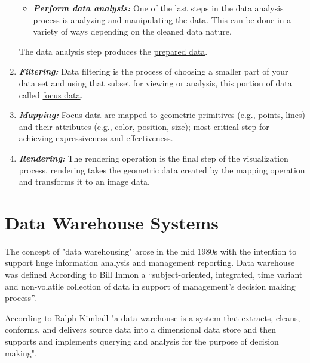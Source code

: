 \begin{enumerate}
\begin{itemize}
  \item \textbf{\textit{Perform data analysis:}}  One of the last steps in the data analysis process is analyzing and manipulating the data. This can be done in a variety of ways depending on the cleaned data nature\cite{WhatDataAnalysis}.
  \end{itemize}
  The data analysis step produces the \underline{prepared data}.
  \item \textbf{\textit{Filtering:}} Data filtering is the process of choosing a smaller part of your data set and using that subset for viewing or analysis\cite{WhatDataFiltering}, this portion of data called \underline{focus data}. 
  \item \textbf{\textit{Mapping:}} Focus data are mapped to geometric primitives (e.g., points, lines) and their attributes (e.g., color, position, size); most critical step for achieving expressiveness and effectiveness.
  \item \textbf{\textit{Rendering:}} The rendering operation is the final step of the visualization process, rendering takes the geometric data created by the mapping operation and transforms it to an image data.
  \end{enumerate}
  



\section{Data Warehouse Systems}
\label{sec:dataWarehouse}
The concept of "data warehousing" arose in the mid 1980s with the intention to support huge information analysis and management reporting\cite{wahDevelopmentDataWarehouse2009}. Data warehouse was defined According to Bill Inmon a “subject-oriented, integrated, time variant and non-volatile collection of data in support of management’s decision making process”\cite{inmonBuildingDataWarehouse2005}.
 
 
According to Ralph Kimball "a data warehouse is a system that extracts, cleans, conforms, and delivers source data into a dimensional data store and then supports and implements querying and analysis for the purpose of decision making"\cite{kimballDataWarehouseETLToolkit2011}.

